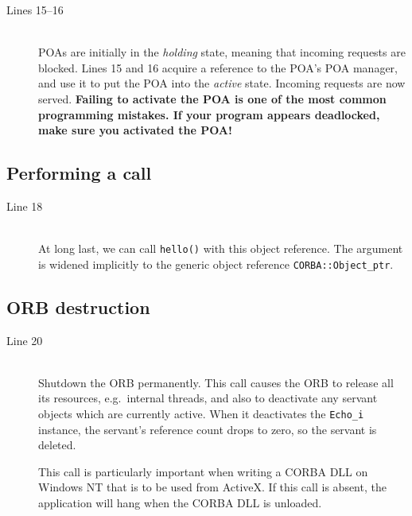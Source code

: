 \documentclass[11pt,twoside,a4paper]{book}
\newcommand{\type}[1]{\texttt{#1}}
\newcommand{\op}[1]{\texttt{#1()}}
\newcommand{\term}[1]{\textit{#1}}
\begin{document}
\begin{description}

\item[Lines 15--16]\mbox{}\\
%
POAs are initially in the \term{holding} state, meaning that incoming
requests are blocked. Lines 15 and 16 acquire a reference to the POA's
POA manager, and use it to put the POA into the \term{active} state.
Incoming requests are now served. \textbf{Failing to activate the POA
is one of the most common programming mistakes. If your program
appears deadlocked, make sure you activated the POA!}

\end{description}


\subsection{Performing a call}

\begin{description}

\item[Line 18]\mbox{}\\
%
At long last, we can call \op{hello} with this object reference. The
argument is widened implicitly to the generic object reference
\type{CORBA::Object\_ptr}.

\end{description}


\subsection{ORB destruction}

\begin{description}

\item[Line 20]\mbox{}\\
%
Shutdown the ORB permanently. This call causes the ORB to release all
its resources, e.g.\ internal threads, and also to deactivate any
servant objects which are currently active. When it deactivates the
\type{Echo\_i} instance, the servant's reference count drops to zero,
so the servant is deleted.

This call is particularly important when writing a CORBA DLL on
Windows NT that is to be used from ActiveX. If this call is absent,
the application will hang when the CORBA DLL is unloaded.

\end{description}
\end{document}
